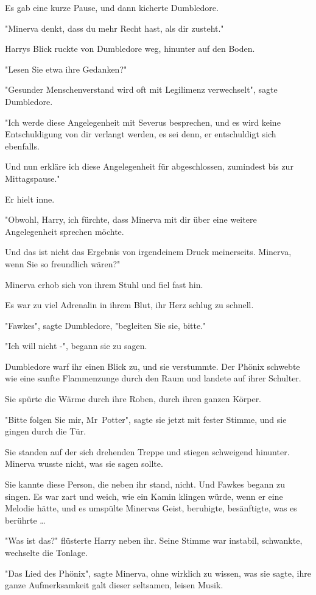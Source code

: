 {Es gab eine kurze Pause, und dann kicherte Dumbledore.

"Minerva denkt, dass du mehr Recht hast, als dir zusteht."

Harrys Blick ruckte von Dumbledore weg, hinunter auf den Boden.

"Lesen Sie etwa ihre Gedanken?"

"Gesunder Menschenverstand wird oft mit Legilimenz verwechselt", sagte Dumbledore.

"Ich werde diese Angelegenheit mit Severus besprechen, und es wird keine Entschuldigung von dir verlangt werden, es sei denn, er entschuldigt sich ebenfalls.

Und nun erkläre ich diese Angelegenheit für abgeschlossen, zumindest bis zur Mittagspause."

Er hielt inne.

"Obwohl, Harry, ich fürchte, dass Minerva mit dir über eine weitere Angelegenheit sprechen möchte.

Und das ist nicht das Ergebnis von irgendeinem Druck meinerseits. Minerva, wenn Sie so freundlich wären?"

Minerva erhob sich von ihrem Stuhl und fiel fast hin.

Es war zu viel Adrenalin in ihrem Blut, ihr Herz schlug zu schnell.

"Fawkes", sagte Dumbledore, "begleiten Sie sie, bitte."

"Ich will nicht -", begann sie zu sagen.

Dumbledore warf ihr einen Blick zu, und sie verstummte. Der Phönix schwebte wie eine sanfte Flammenzunge durch den Raum und landete auf ihrer Schulter.

Sie spürte die Wärme durch ihre Roben, durch ihren ganzen Körper.

"Bitte folgen Sie mir, Mr~Potter", sagte sie jetzt mit fester Stimme, und sie gingen durch die Tür.

Sie standen auf der sich drehenden Treppe und stiegen schweigend hinunter. Minerva wusste nicht, was sie sagen sollte.

Sie kannte diese Person, die neben ihr stand, nicht. Und Fawkes begann zu singen. Es war zart und weich, wie ein Kamin klingen würde, wenn er eine Melodie hätte, und es umspülte Minervas Geist, beruhigte, besänftigte, was es berührte …

"Was ist das?" flüsterte Harry neben ihr. Seine Stimme war instabil, schwankte, wechselte die Tonlage.

"Das Lied des Phönix", sagte Minerva, ohne wirklich zu wissen, was sie sagte, ihre ganze Aufmerksamkeit galt dieser seltsamen, leisen Musik.

}
